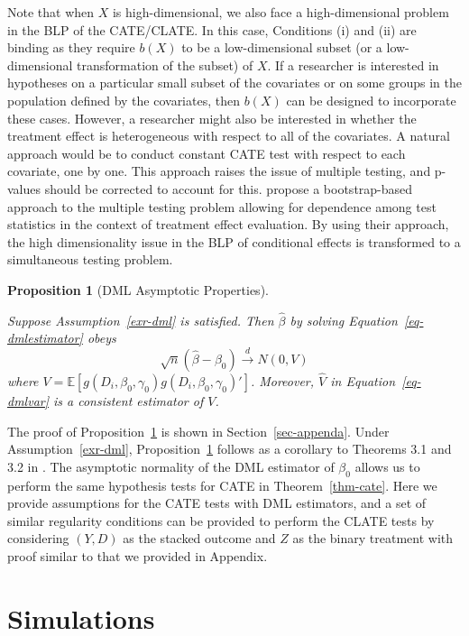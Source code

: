 \documentclass[
  12pt,
  12pt]{article}
\numberwithin{equation}{section}
\theoremstyle{definition}
\theoremstyle{plain}
\newtheorem{proposition}{Proposition}[section]
\theoremstyle{plain}
\theoremstyle{remark}
\begin{document}
Note that when \(X\) is high-dimensional, we also face a
high-dimensional problem in the BLP of the CATE/CLATE. In this case,
Conditions (i) and (ii) are binding as they require \(b(X)\) to be a
low-dimensional subset (or a low-dimensional transformation of the
subset) of \(X\). If a researcher is interested in hypotheses on a
particular small subset of the covariates or on some groups in the
population defined by the covariates, then \(b(X)\) can be designed to
incorporate these cases. However, a researcher might also be interested
in whether the treatment effect is heterogeneous with respect to all of
the covariates. A natural approach would be to conduct constant CATE
test with respect to each covariate, one by one. This approach raises
the issue of multiple testing, and p-values should be corrected to
account for this. \citet{list2016multiple} propose a bootstrap-based
approach to the multiple testing problem allowing for dependence among
test statistics in the context of treatment effect evaluation. By using
their approach, the high dimensionality issue in the BLP of conditional
effects is transformed to a simultaneous testing problem.

\begin{proposition}[DML Asymptotic
Properties]\protect\hypertarget{prp-dml}{}\label{prp-dml}

Suppose Assumption~\ref{exr-dml} is satisfied. Then \(\hat\beta\) by
solving Equation~\ref{eq-dmlestimator} obeys \[
\sqrt{n}(\hat\beta - \beta_0) \xrightarrow{d} N(0, V)
\] where
\(V = \mathbb{E}[g(D_i, \beta_0, \gamma_0)g(D_i, \beta_0, \gamma_0)']\).
Moreover, \(\hat{V}\) in Equation~\ref{eq-dmlvar} is a consistent
estimator of \(V\).

\end{proposition}

The proof of Proposition~\ref{prp-dml} is shown in
Section~\ref{sec-appenda}. Under Assumption~\ref{exr-dml},
Proposition~\ref{prp-dml} follows as a corollary to Theorems 3.1 and 3.2
in \citet{chernozhukov2018double}. The asymptotic normality of the DML
estimator of \(\beta_0\) allows us to perform the same hypothesis tests
for CATE in Theorem~\ref{thm-cate}. Here we provide assumptions for the
CATE tests with DML estimators, and a set of similar regularity
conditions can be provided to perform the CLATE tests by considering
\((Y, D)\) as the stacked outcome and \(Z\) as the binary treatment with
proof similar to that we provided in Appendix.

\section{Simulations}\label{sec-sim}
\end{document}
